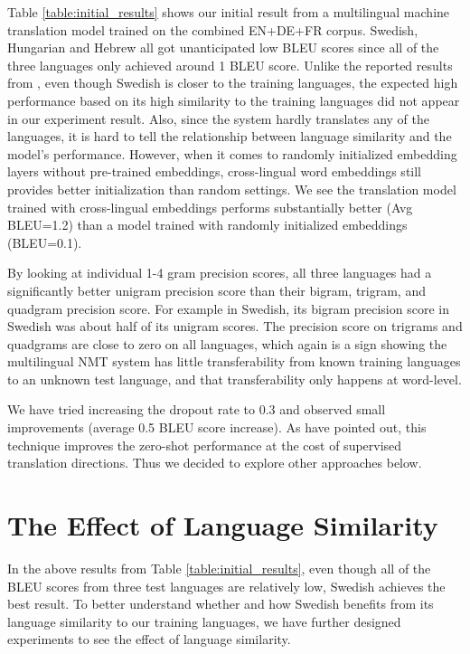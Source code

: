 \documentclass[thesis]{cluu}
\begin{document}
Table \ref{table:initial_results} shows our initial result from a multilingual machine translation model trained on the combined EN+DE+FR corpus. Swedish, Hungarian and Hebrew all got unanticipated low BLEU scores since all of the three languages only achieved around 1 BLEU score. Unlike the reported results from \textcite{Qi:2018aa}, even though Swedish is closer to the training languages, the expected high performance based on its high similarity to the training languages did not appear in our experiment result. Also, since the system hardly translates any of the languages, it is hard to tell the relationship between language similarity and the model's performance. However, when it comes to randomly initialized embedding layers without pre-trained embeddings, cross-lingual word embeddings still provides better initialization than random settings. We see the translation model trained with cross-lingual embeddings performs substantially better (Avg BLEU=1.2) than a model trained with randomly initialized embeddings (BLEU=0.1).

By looking at individual 1-4 gram precision scores, all three languages had a significantly better unigram precision score than their bigram, trigram, and quadgram precision score. For example in Swedish, its bigram precision score in Swedish was about half of its unigram scores. The precision score on trigrams and quadgrams are close to zero on all languages, which again is a sign showing the multilingual NMT system has little transferability from known training languages to an unknown test language, and that transferability only happens at word-level.

We have tried increasing the dropout rate to 0.3 and observed small improvements (average 0.5 BLEU score increase). As \textcite{Arivazhagan:2019aa} have pointed out, this technique improves the zero-shot performance at the cost of supervised translation directions. Thus we decided to explore other approaches below.

\section{The Effect of Language Similarity}
\label{sec:language_similarity}

In the above results from Table \ref{table:initial_results}, even though all of the BLEU scores from three test languages are relatively low, Swedish achieves the best result. To better understand whether and how Swedish benefits from its language similarity to our training languages, we have further designed experiments to see the effect of language similarity.
\end{document}
